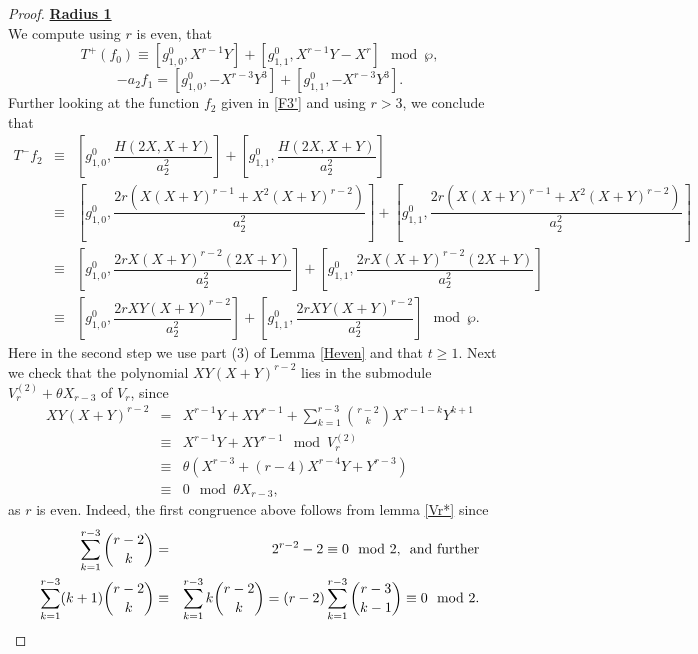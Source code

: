 \documentclass[11pt, reqno]{amsart}
\numberwithin{equation}{section}
\theoremstyle{definition}
\theoremstyle{remark}
\theoremstyle{definition}
\theoremstyle{remark}
\theoremstyle{remark}
\begin{document}
\begin{proof}
\noindent\underline{\textbf{Radius 1}}\\
We compute using $r$ is even, that
\begin{equation}\label{F3'T+f0}
T^{+}(f_{0}) \equiv [g_{1,0}^{0}, X^{r-1}Y] + [g_{1,1}^{0}, X^{r-1}Y-X^{r}] \mod\wp, 
\end{equation}
\begin{equation}\label{F3'a2f1}
    -a_{2}f_{1} = [g_{1,0}^{0}, -X^{r-3}Y^3] + [g_{1,1}^{0}, -X^{r-3}Y^3].
\end{equation}
Further looking at the function $f_2$ given in \eqref{F3'} and using $r>3$, we conclude that
\begin{eqnarray*}
   T^{-}f_{2}&\equiv & \left[g_{1,0}^{0}, \dfrac{H(2X,X+Y)}{a_{2}^2} \right] + \left[g_{1,1}^{0}, \dfrac{H(2X,X+Y)}{a_{2}^2}\right]\\
   &\equiv& \left[g_{1,0}^{0}, \dfrac{2r(X(X+Y)^{r-1}+ X^2(X+Y)^{r-2})}{a_{2}^2}\right]+ \left[g_{1,1}^{0}, \dfrac{2r(X(X+Y)^{r-1}+ X^2(X+Y)^{r-2})}{a_{2}^2}\right]\\
   &\equiv & \left[g_{1,0}^{0}, \dfrac{2rX(X+Y)^{r-2}(2X+Y)}{a_{2}^2} \right]+ \left[g_{1,1}^{0}, \dfrac{2rX(X+Y)^{r-2}(2X+Y)}{a_{2}^2} \right] \\
& \equiv & \left[g_{1,0}^{0}, \dfrac{2rXY(X+Y)^{r-2}}{a_{2}^2} \right]+ \left[g_{1,1}^{0}, \dfrac{2rXY(X+Y)^{r-2}}{a_{2}^2} \right] \mod \wp.
\end{eqnarray*}
Here in the second step we use part (3) of Lemma \ref{Heven} and that $t\geq 1$.
Next we check that the polynomial  $XY(X+Y)^{r-2}$ lies in the submodule $V_r^{(2)}+\theta X_{r-3}$ of $V_r$, since
\begin{eqnarray*}
XY(X+Y)^{r-2} & = &X^{r-1}Y + XY^{r-1} + \displaystyle\sum_{k=1}^{r-3}{r-2 \choose k}X^{r-1-k}Y^{k+1}\\
&\equiv &X^{r-1}Y + XY^{r-1}\mod V_{r}^{(2)}\\
&\equiv &  \theta (X^{r-3} + (r-4)X^{r-4}Y + Y^{r-3})\\
&\equiv& 0 \mod \theta X_{r-3},
\end{eqnarray*}
as $r$ is even.
Indeed, the first congruence above follows from lemma \ref{Vr*} since
\begin{eqnarray*}
\displaystyle\sum_{k=1}^{r-3}{r-2 \choose k} &= &2^{r-2}-2 \equiv 0\mod 2, \text{\,  and further}\\
\displaystyle\sum_{k=1}^{r-3}(k+1){r-2 \choose k} &\equiv&\displaystyle\sum_{k=1}^{r-3}k{r-2 \choose k}=(r-2)\displaystyle\sum_{k=1}^{r-3}{r-3 \choose k-1}  \equiv 0\mod 2.
\end{eqnarray*}


\end{proof}
\end{document}
